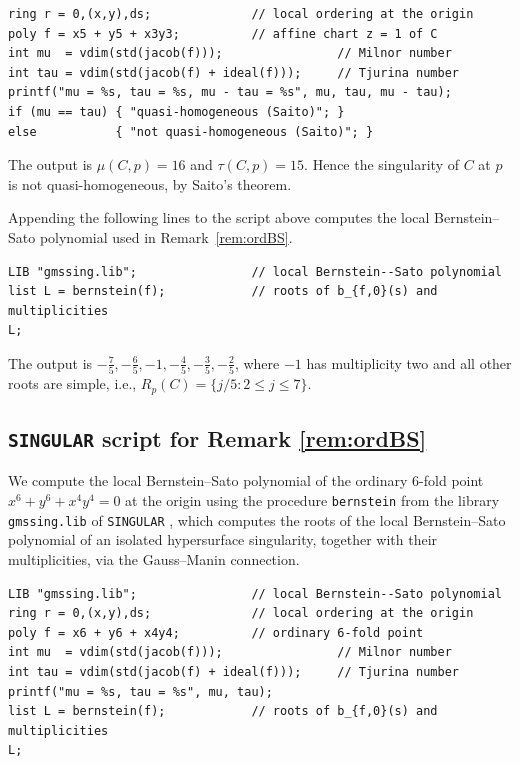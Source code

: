 \documentclass[11pt]{amsart}
\theoremstyle{definition}
\numberwithin{equation}{section}
\newcommand{\gadd}[1]{#1}
\newcommand{\gblock}{}
\begin{document}
\begin{verbatim}
ring r = 0,(x,y),ds;              // local ordering at the origin
poly f = x5 + y5 + x3y3;          // affine chart z = 1 of C
int mu  = vdim(std(jacob(f)));                // Milnor number
int tau = vdim(std(jacob(f) + ideal(f)));     // Tjurina number
printf("mu = %s, tau = %s, mu - tau = %s", mu, tau, mu - tau);
if (mu == tau) { "quasi-homogeneous (Saito)"; }
else           { "not quasi-homogeneous (Saito)"; }
\end{verbatim}

The output is $\mu(C,p)=16$ and $\tau(C,p)=15$. Hence the singularity
of $C$ at $p$ is not quasi-homogeneous, by Saito's theorem.

\gadd{Appending the following lines to the script above computes the local Bernstein--Sato polynomial used in Remark~\ref{rem:ordBS}.}
{\gblock
\begin{verbatim}
LIB "gmssing.lib";                // local Bernstein--Sato polynomial
list L = bernstein(f);            // roots of b_{f,0}(s) and multiplicities
L;
\end{verbatim}}
\gadd{The output is $-\tfrac75,-\tfrac65,-1,-\tfrac45,-\tfrac35,-\tfrac25$, where $-1$ has multiplicity two and all other roots are simple, i.e., $R_p(C)=\{j/5\colon2\le j\le7\}$.}

\subsection*{\texttt{SINGULAR} script for Remark \ref{rem:ordBS}}
We compute the local Bernstein--Sato polynomial of the ordinary $6$-fold point
$x^6+y^6+x^4y^4=0$ at the origin using the procedure \texttt{bernstein} from the library
\texttt{gmssing.lib} of \texttt{SINGULAR} \cite{Sing}, which computes the roots of the local
Bernstein--Sato polynomial of an isolated hypersurface singularity, together with their
multiplicities, via the Gauss--Manin connection.

\begin{verbatim}
LIB "gmssing.lib";                // local Bernstein--Sato polynomial
ring r = 0,(x,y),ds;              // local ordering at the origin
poly f = x6 + y6 + x4y4;          // ordinary 6-fold point
int mu  = vdim(std(jacob(f)));                // Milnor number
int tau = vdim(std(jacob(f) + ideal(f)));     // Tjurina number
printf("mu = %s, tau = %s", mu, tau);
list L = bernstein(f);            // roots of b_{f,0}(s) and multiplicities
L;
\end{verbatim}
\end{document}
